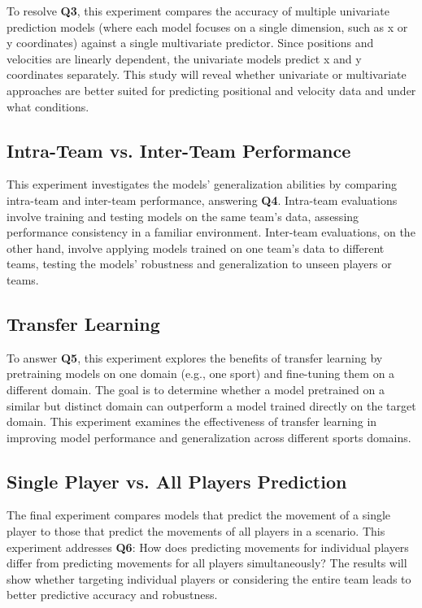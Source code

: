 To resolve \textbf{Q3}, this experiment compares the accuracy of multiple univariate prediction models (where each model focuses on a single dimension, such as x or y coordinates) against a single multivariate predictor. Since positions and velocities are linearly dependent, the univariate models predict x and y coordinates separately. This study will reveal whether univariate or multivariate approaches are better suited for predicting positional and velocity data and under what conditions.

\subsection{Intra-Team vs. Inter-Team Performance}

This experiment investigates the models' generalization abilities by comparing intra-team and inter-team performance, answering \textbf{Q4}. Intra-team evaluations involve training and testing models on the same team’s data, assessing performance consistency in a familiar environment. Inter-team evaluations, on the other hand, involve applying models trained on one team’s data to different teams, testing the models' robustness and generalization to unseen players or teams.

\subsection{Transfer Learning}

To answer \textbf{Q5}, this experiment explores the benefits of transfer learning by pretraining models on one domain (e.g., one sport) and fine-tuning them on a different domain. The goal is to determine whether a model pretrained on a similar but distinct domain can outperform a model trained directly on the target domain. This experiment examines the effectiveness of transfer learning in improving model performance and generalization across different sports domains.

\subsection{Single Player vs. All Players Prediction}

The final experiment compares models that predict the movement of a single player to those that predict the movements of all players in a scenario. This experiment addresses \textbf{Q6}: How does predicting movements for individual players differ from predicting movements for all players simultaneously? The results will show whether targeting individual players or considering the entire team leads to better predictive accuracy and robustness.


